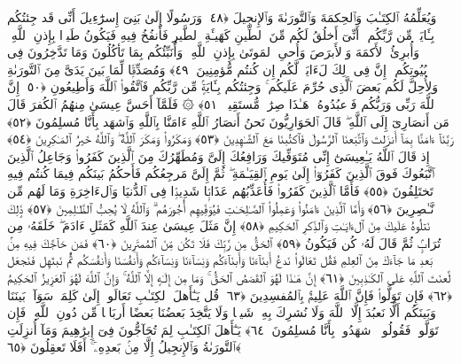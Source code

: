  وَيُعَلِّمُهُ ٱلكِتَـٰبَ وَٱلحِكمَةَ وَٱلتَّورَىٰةَ وَٱلإِنجِيلَ ﴿٤٨﴾
 وَرَسُولًا إِلَىٰ بَنِىٓ إِسرَٰٓءِيلَ أَنِّى قَد جِئتُكُم بِـَٔايَةٍۢ مِّن رَّبِّكُم ۖ أَنِّىٓ أَخلُقُ لَكُم مِّنَ ٱلطِّينِ كَهَيـَٔةِ ٱلطَّيرِ فَأَنفُخُ فِيهِ فَيَكُونُ طَيرًۢا بِإِذنِ ٱللَّهِ ۖ وَأُبرِئُ ٱلأَكمَهَ وَٱلأَبرَصَ وَأُحىِ ٱلمَوتَىٰ بِإِذنِ ٱللَّهِ ۖ وَأُنَبِّئُكُم بِمَا تَأكُلُونَ وَمَا تَدَّخِرُونَ فِى بُيُوتِكُم ۚ إِنَّ فِى ذَٟلِكَ لَءَايَةًۭ لَّكُم إِن كُنتُم مُّؤمِنِينَ ﴿٤٩﴾
 وَمُصَدِّقًۭا لِّمَا بَينَ يَدَىَّ مِنَ ٱلتَّورَىٰةِ وَلِأُحِلَّ لَكُم بَعضَ ٱلَّذِى حُرِّمَ عَلَيكُم ۚ وَجِئتُكُم بِـَٔايَةٍۢ مِّن رَّبِّكُم فَٱتَّقُوا۟ ٱللَّهَ وَأَطِيعُونِ ﴿٥٠﴾
 إِنَّ ٱللَّهَ رَبِّى وَرَبُّكُم فَٱعبُدُوهُ ۗ هَـٰذَا صِرَٰطٌۭ مُّستَقِيمٌۭ ﴿٥١﴾
 ۞ فَلَمَّآ أَحَسَّ عِيسَىٰ مِنهُمُ ٱلكُفرَ قَالَ مَن أَنصَارِىٓ إِلَى ٱللَّهِ ۖ قَالَ ٱلحَوَارِيُّونَ نَحنُ أَنصَارُ ٱللَّهِ ءَامَنَّا بِٱللَّهِ وَٱشهَد بِأَنَّا مُسلِمُونَ ﴿٥٢﴾
 رَبَّنَآ ءَامَنَّا بِمَآ أَنزَلتَ وَٱتَّبَعنَا ٱلرَّسُولَ فَٱكتُبنَا مَعَ ٱلشَّـٰهِدِينَ ﴿٥٣﴾
 وَمَكَرُوا۟ وَمَكَرَ ٱللَّهُ ۖ وَٱللَّهُ خَيرُ ٱلمَـٰكِرِينَ ﴿٥٤﴾
 إِذ قَالَ ٱللَّهُ يَـٰعِيسَىٰٓ إِنِّى مُتَوَفِّيكَ وَرَافِعُكَ إِلَىَّ وَمُطَهِّرُكَ مِنَ ٱلَّذِينَ كَفَرُوا۟ وَجَاعِلُ ٱلَّذِينَ ٱتَّبَعُوكَ فَوقَ ٱلَّذِينَ كَفَرُوٓا۟ إِلَىٰ يَومِ ٱلقِيَـٰمَةِ ۖ ثُمَّ إِلَىَّ مَرجِعُكُم فَأَحكُمُ بَينَكُم فِيمَا كُنتُم فِيهِ تَختَلِفُونَ ﴿٥٥﴾
 فَأَمَّا ٱلَّذِينَ كَفَرُوا۟ فَأُعَذِّبُهُم عَذَابًۭا شَدِيدًۭا فِى ٱلدُّنيَا وَٱلءَاخِرَةِ وَمَا لَهُم مِّن نَّـٰصِرِينَ ﴿٥٦﴾
 وَأَمَّا ٱلَّذِينَ ءَامَنُوا۟ وَعَمِلُوا۟ ٱلصَّـٰلِحَـٰتِ فَيُوَفِّيهِم أُجُورَهُم ۗ وَٱللَّهُ لَا يُحِبُّ ٱلظَّـٰلِمِينَ ﴿٥٧﴾
 ذَٟلِكَ نَتلُوهُ عَلَيكَ مِنَ ٱلءَايَـٰتِ وَٱلذِّكرِ ٱلحَكِيمِ ﴿٥٨﴾
 إِنَّ مَثَلَ عِيسَىٰ عِندَ ٱللَّهِ كَمَثَلِ ءَادَمَ ۖ خَلَقَهُۥ مِن تُرَابٍۢ ثُمَّ قَالَ لَهُۥ كُن فَيَكُونُ ﴿٥٩﴾
 ٱلحَقُّ مِن رَّبِّكَ فَلَا تَكُن مِّنَ ٱلمُمتَرِينَ ﴿٦٠﴾
 فَمَن حَآجَّكَ فِيهِ مِنۢ بَعدِ مَا جَآءَكَ مِنَ ٱلعِلمِ فَقُل تَعَالَوا۟ نَدعُ أَبنَآءَنَا وَأَبنَآءَكُم وَنِسَآءَنَا وَنِسَآءَكُم وَأَنفُسَنَا وَأَنفُسَكُم ثُمَّ نَبتَهِل فَنَجعَل لَّعنَتَ ٱللَّهِ عَلَى ٱلكَـٰذِبِينَ ﴿٦١﴾
 إِنَّ هَـٰذَا لَهُوَ ٱلقَصَصُ ٱلحَقُّ ۚ وَمَا مِن إِلَـٰهٍ إِلَّا ٱللَّهُ ۚ وَإِنَّ ٱللَّهَ لَهُوَ ٱلعَزِيزُ ٱلحَكِيمُ ﴿٦٢﴾
 فَإِن تَوَلَّوا۟ فَإِنَّ ٱللَّهَ عَلِيمٌۢ بِٱلمُفسِدِينَ ﴿٦٣﴾
 قُل يَـٰٓأَهلَ ٱلكِتَـٰبِ تَعَالَوا۟ إِلَىٰ كَلِمَةٍۢ سَوَآءٍۭ بَينَنَا وَبَينَكُم أَلَّا نَعبُدَ إِلَّا ٱللَّهَ وَلَا نُشرِكَ بِهِۦ شَيـًۭٔا وَلَا يَتَّخِذَ بَعضُنَا بَعضًا أَربَابًۭا مِّن دُونِ ٱللَّهِ ۚ فَإِن تَوَلَّوا۟ فَقُولُوا۟ ٱشهَدُوا۟ بِأَنَّا مُسلِمُونَ ﴿٦٤﴾
 يَـٰٓأَهلَ ٱلكِتَـٰبِ لِمَ تُحَآجُّونَ فِىٓ إِبرَٰهِيمَ وَمَآ أُنزِلَتِ ٱلتَّورَىٰةُ وَٱلإِنجِيلُ إِلَّا مِنۢ بَعدِهِۦٓ ۚ أَفَلَا تَعقِلُونَ ﴿٦٥﴾

